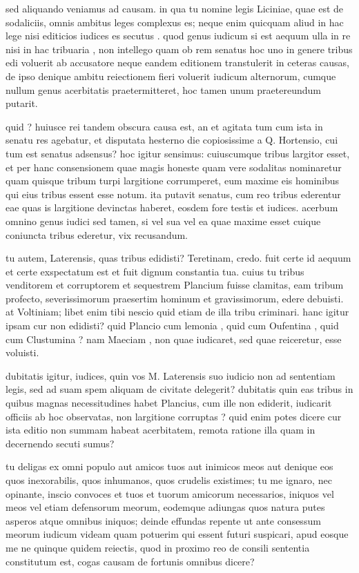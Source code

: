  sed aliquando veniamus ad causam. in qua tu nomine legis Liciniae, quae est de sodaliciis, omnis ambitus leges complexus es; neque enim quicquam aliud in hac lege nisi editicios iudices es secutus . quod genus iudicum si est aequum ulla in re nisi in hac tribuaria , non intellego quam ob rem senatus hoc uno in genere tribus edi voluerit ab accusatore neque eandem editionem transtulerit in ceteras causas, de ipso denique ambitu reiectionem fieri voluerit iudicum alternorum, cumque nullum genus acerbitatis praetermitteret, hoc tamen unum praetereundum putarit.

 quid ? huiusce rei tandem obscura causa est, an et agitata tum cum ista in senatu res agebatur, et disputata hesterno die copiosissime a Q. Hortensio, cui tum est senatus adsensus? hoc igitur sensimus: cuiuscumque tribus largitor esset, et per hanc consensionem quae magis honeste quam vere sodalitas nominaretur quam quisque tribum turpi largitione corrumperet, eum maxime eis hominibus qui eius tribus essent esse notum. ita putavit senatus, cum reo tribus ederentur eae quas is largitione devinctas haberet, eosdem fore testis et iudices. acerbum omnino genus iudici sed tamen, si vel sua vel ea quae maxime esset cuique coniuncta tribus ederetur, vix recusandum.

 tu autem, Laterensis, quas tribus edidisti? Teretinam, credo. fuit certe id aequum et certe exspectatum est et fuit dignum constantia tua. cuius tu tribus venditorem et corruptorem et sequestrem Plancium fuisse clamitas, eam tribum profecto, severissimorum praesertim hominum et gravissimorum, edere debuisti. at Voltiniam; libet enim tibi nescio quid etiam de illa tribu criminari. hanc igitur ipsam cur non edidisti? quid Plancio cum lemonia , quid cum Oufentina , quid cum Clustumina ? nam Maeciam , non quae iudicaret, sed quae reiceretur, esse voluisti.

 dubitatis igitur, iudices, quin vos M. Laterensis suo iudicio non ad sententiam legis, sed ad suam spem aliquam de civitate delegerit? dubitatis quin eas tribus in quibus magnas necessitudines habet Plancius, cum ille non ediderit, iudicarit officiis ab hoc observatas, non largitione corruptas ? quid enim potes dicere cur ista editio non summam habeat acerbitatem, remota ratione illa quam in decernendo secuti sumus?

 tu deligas ex omni populo aut amicos tuos aut inimicos meos aut denique eos quos inexorabilis, quos inhumanos, quos crudelis existimes; tu me ignaro, nec opinante, inscio convoces et tuos et tuorum amicorum necessarios, iniquos vel meos vel etiam defensorum meorum, eodemque adiungas quos natura putes asperos atque omnibus iniquos; deinde effundas repente ut ante consessum meorum iudicum videam quam potuerim qui essent futuri suspicari, apud eosque me ne quinque quidem reiectis, quod in proximo reo de consili sententia constitutum est, cogas causam de fortunis omnibus dicere?

